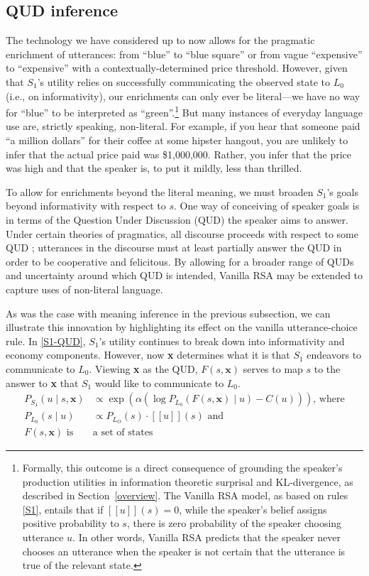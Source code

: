 \documentclass{sp}
\newcommand{\sem}[1]{\ensuremath{[\![#1]\!]}}
\begin{document}
\subsection{QUD inference} \label{QUD-section}

The technology we have considered up to now allows for the pragmatic enrichment of utterances: from ``blue'' to ``blue square'' or from vague ``expensive'' to ``expensive'' with a contextually-determined price threshold. However, given that $S_1$'s utility relies on successfully communicating the observed state to $L_0$ (i.e., on informativity), our enrichments can only ever be literal---we have no way for ``blue'' to be interpreted as ``green''.\footnote{
  Formally, this outcome is a direct consequence of grounding the speaker's production utilities in information theoretic surprisal and KL-divergence, as described in Section~\ref{overview}. The Vanilla RSA model, as based on rules \eqref{S1}, entails that if $\sem{u}(s)=0$, while the speaker's belief assigns positive probability to $s$, there is zero probability of the speaker choosing utterance $u$. In other words, Vanilla RSA predicts that the speaker never chooses an utterance when the speaker is not certain that the utterance is true of the relevant state.
}
But many instances of everyday language use are, strictly speaking, non-literal. For example, if you hear that someone paid ``a million dollars'' for their coffee at some hipster hangout, you are unlikely to infer that the actual price paid was \$1,000,000. Rather, you infer that the price was high and that the speaker is, to put it mildly, less than thrilled.

To allow for enrichments beyond the literal meaning, we must broaden $S_1$'s goals beyond informativity with respect to $s$. One way of conceiving of speaker goals is in terms of the Question Under Discussion (QUD) the speaker aims to answer. Under certain theories of pragmatics, all discourse proceeds with respect to some QUD \citep{roberts2012}; utterances in the discourse must at least partially answer the QUD in order to be cooperative and felicitous. By allowing for a broader range of QUDs and uncertainty around which QUD is intended, Vanilla RSA may be extended to capture uses of non-literal language.

As was the case with meaning inference in the previous subsection, we can illustrate this innovation by highlighting its effect on the vanilla utterance-choice rule. In \eqref{S1-QUD}, $S_1$'s utility continues to break down into informativity and economy components. However, now \textbf{x} determines what it is that $S_1$ endeavors to communicate to $L_0$. Viewing \textbf{x} as the QUD, $F(s,\textbf{x})$ serves to map $s$ to the answer to \textbf{x} that $S_1$ would like to communicate to $L_0$.
\begin{align} \label{S1-QUD}
P_{S_1}(u\mid s, \textbf{x}) & \propto \exp (\alpha (\log P_{L_0}(F(s,\textbf{x})\mid u) - C(u)))\text{, where} \\
  P_{L_0}(s \mid u) & \propto P_{L_O}(s)  \cdot \sem{u}(s) \text{ and } \nonumber \\
  F(s,\textbf{x}) \text{ is } & \text{a set of states} \nonumber 
\end{align}
\end{document}
